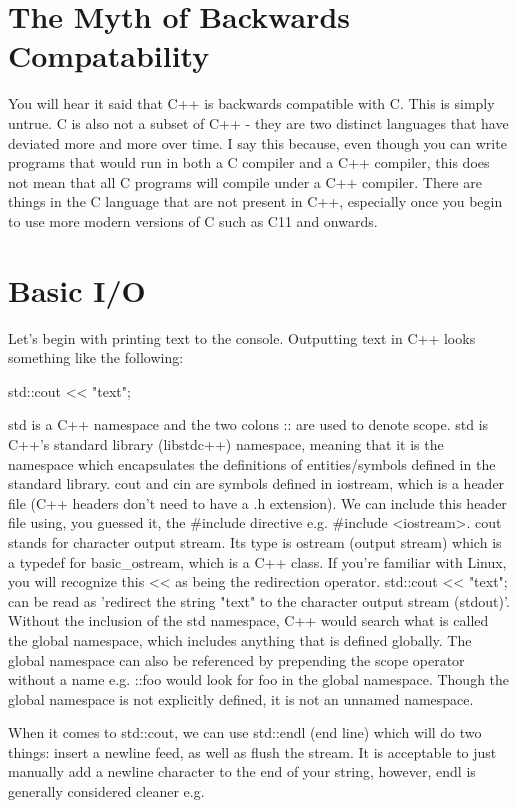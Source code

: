 \documentclass{article}
\begin{document}
\section{The Myth of Backwards Compatability}

You will hear it said that C++ is backwards compatible with C. This is simply untrue. C is also not a subset
of C++ - they are two distinct languages that have deviated more and more over time. I say this because, even
though you can write programs that would run in both a C compiler and a C++ compiler, this does not mean that
all C programs will compile under a C++ compiler. There are things in the C language that are not present in
C++, especially once you begin to use more modern versions of C such as C11 and onwards.

\section{Basic I/O}

Let's begin with printing text to the console. Outputting text in C++ looks something like the following:

\begin{cpplst}
std::cout << "text";
\end{cpplst}

std is a C++ namespace and the two colons :: are used to denote scope. std is C++'s standard library
(libstdc++) namespace, meaning that it is the namespace which encapsulates the definitions of entities/symbols
defined in the standard library. cout and cin are symbols defined in iostream, which is a header file (C++
headers don't need to have a .h extension). We can include this header file using, you guessed it, the
\#include directive e.g. \#include <iostream>. cout stands for character output stream. Its type is ostream
(output stream) which is a typedef for basic\_ostream, which is a C++ class. If you’re familiar with Linux,
you will recognize this << as being the redirection operator. std::cout << "text"; can be read as 'redirect
the string "text" to the character output stream (stdout)'. Without the inclusion of the std namespace, C++
would search what is called the global namespace, which includes anything that is defined globally. The global
namespace can also be referenced by prepending the scope operator without a name e.g. ::foo would look for foo
in the global namespace. Though the global namespace is not explicitly defined, it is not an unnamed namespace.

When it comes to std::cout, we can use std::endl (end line) which will do two things: insert a newline feed,
as well as flush the stream. It is acceptable to just manually add a newline character to the end of your
string, however, endl is generally considered cleaner e.g.
\end{document}
